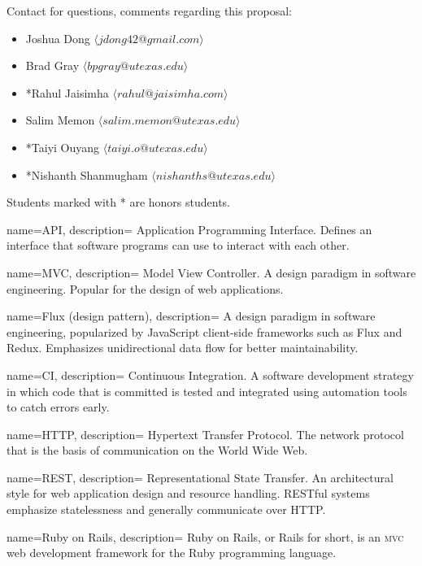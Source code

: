 \documentclass{article}
\begin{document}
Contact for questions, comments regarding this proposal: 
\vspace{1em}
\begin{itemize}
    \item Joshua Dong $\langle jdong42@gmail.com \rangle$
    \item Brad Gray $\langle bpgray@utexas.edu \rangle$
    \item *Rahul Jaisimha $\langle rahul@jaisimha.com \rangle$
	\item Salim Memon $\langle salim.memon@utexas.edu  \rangle$
    \item *Taiyi Ouyang $\langle taiyi.o@utexas.edu \rangle$
    \item *Nishanth Shanmugham $\langle nishanths@utexas.edu \rangle$
\end{itemize}
\vspace{1em}
Students marked with * are honors students.

{
  name=API,
  description={
    Application Programming Interface. Defines an interface that software programs can use to interact with each other.
 } 
}

{
  name=MVC,
  description={
    Model View Controller. A design paradigm in software engineering. Popular for the design of web applications.
  }
}

{
  name=Flux (design pattern),
  description={
    A design paradigm in software engineering, popularized by JavaScript client-side frameworks such as Flux and Redux. Emphasizes unidirectional data flow for better maintainability.
  }
}

{
  name=CI,
  description={
    Continuous Integration. A software development strategy in which code that is committed is tested and integrated using automation tools to catch errors early.
  }
}

{
  name=HTTP,
  description={
    Hypertext Transfer Protocol. The network protocol that is the basis of communication on the World Wide Web.
  }
}

{
  name=REST,
  description={
    Representational State Transfer. An architectural style for web application design and resource handling. RESTful systems emphasize statelessness and generally communicate over HTTP.
  }
}

{
  name=Ruby on Rails,
  description={
    Ruby on Rails, or Rails for short, is an \textsc{mvc} web development framework for the Ruby programming language.
  }
}
\end{document}
